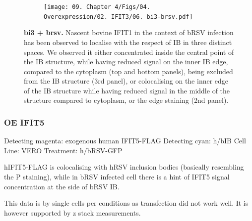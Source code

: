 \begin{figure}
\begin{subfigure}{0.5\textwidth}
    \end{subfigure}
    \begin{subfigure}{1\textwidth}
        \centering
        \caption{}
        \texttt{[image: 09. Chapter 4/Figs/04. Overexpression/02. IFIT3/06. bi3-brsv.pdf]}
    \end{subfigure}
    \caption[bi3 + brsv]{\textbf{bi3 + brsv.} Nascent bovine IFIT1 in the context of bRSV infection has been observed to localise with the respect of IB in three distinct spaces. We observed it either concentrated inside the central point of the IB structure, while having reduced signal on the inner IB edge, compared to the cytoplasm (top and bottom panels), being excluded from the IB structure (3rd panel), or colocalising on the inner edge of the IB structure while having reduced signal in the middle of the structure compared to cytoplasm, or the edge staining (2nd panel).}
    \label{fig:bi3 + brsv}
\end{figure}

\subsubsection{OE IFIT5}
Detecting magenta: exogenous human IFIT5-FLAG \newline
Detecting cyan: h/bIB \newline
Cell Line: VERO \newline
Treatment: h/bRSV-GFP \newline

hIFIT5-FLAG is colocalising with hRSV inclusion bodies (basically resembling the P staining), while in bRSV infected cell there is a hint of IFIT5 signal concentration at the side of bRSV IB.

This data is by single cells per conditions as transfection did not work well. It is however supported by z stack measurements.

